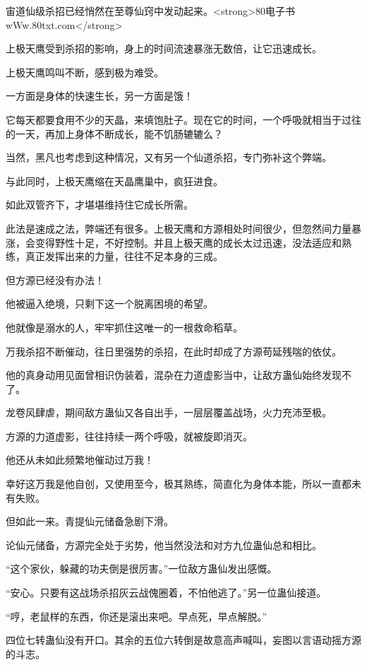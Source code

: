 
\begin{this_body}

宙道仙级杀招已经悄然在至尊仙窍中发动起来。<strong>80电子书wWw.80txt.com</strong>

上极天鹰受到杀招的影响，身上的时间流速暴涨无数倍，让它迅速成长。

上极天鹰鸣叫不断，感到极为难受。

一方面是身体的快速生长，另一方面是饿！

它每天都要食用不少的天晶，来填饱肚子。现在它的时间，一个呼吸就相当于过往的一天，再加上身体不断成长，能不饥肠辘辘么？

当然，黑凡也考虑到这种情况，又有另一个仙道杀招，专门弥补这个弊端。

与此同时，上极天鹰缩在天晶鹰巢中，疯狂进食。

如此双管齐下，才堪堪维持住它成长所需。

此法是速成之法，弊端还有很多。上极天鹰和方源相处时间很少，但忽然间力量暴涨，会变得野性十足，不好控制。并且上极天鹰的成长太过迅速，没法适应和熟练，真正发挥出来的力量，往往不足本身的三成。

但方源已经没有办法！

他被逼入绝境，只剩下这一个脱离困境的希望。

他就像是溺水的人，牢牢抓住这唯一的一根救命稻草。

万我杀招不断催动，往日里强势的杀招，在此时却成了方源苟延残喘的依仗。

他的真身动用见面曾相识伪装着，混杂在力道虚影当中，让敌方蛊仙始终发现不了。

龙卷风肆虐，期间敌方蛊仙又各自出手，一层层覆盖战场，火力充沛至极。

方源的力道虚影，往往持续一两个呼吸，就被旋即消灭。

他还从未如此频繁地催动过万我！

幸好这万我是他自创，又使用至今，极其熟练，简直化为身体本能，所以一直都未有失败。

但如此一来。青提仙元储备急剧下滑。

论仙元储备，方源完全处于劣势，他当然没法和对方九位蛊仙总和相比。

“这个家伙，躲藏的功夫倒是很厉害。”一位敌方蛊仙发出感慨。

“安心。只要有这战场杀招灰云战傀圈着，不怕他逃了。”另一位蛊仙接道。

“哼，老鼠样的东西，你还是滚出来吧。早点死，早点解脱。”

四位七转蛊仙没有开口。其余的五位六转倒是故意高声喊叫，妄图以言语动摇方源的斗志。


\end{this_body}
